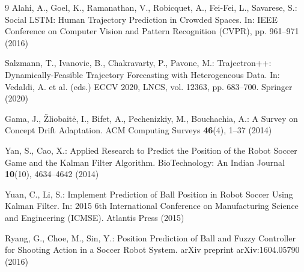 \documentclass[runningheads]{llncs}
\begin{document}
\begin{thebibliography}{9}
Alahi, A., Goel, K., Ramanathan, V., Robicquet, A., Fei-Fei, L., Savarese, S.: Social LSTM: Human Trajectory Prediction in Crowded Spaces. In: IEEE Conference on Computer Vision and Pattern Recognition (CVPR), pp. 961--971 (2016)

Salzmann, T., Ivanovic, B., Chakravarty, P., Pavone, M.: Trajectron++: Dynamically-Feasible Trajectory Forecasting with Heterogeneous Data. In: Vedaldi, A. et al. (eds.) ECCV 2020, LNCS, vol. 12363, pp. 683--700. Springer (2020)

Gama, J., \v{Z}liobait\.e, I., Bifet, A., Pechenizkiy, M., Bouchachia, A.: A Survey on Concept Drift Adaptation. ACM Computing Surveys \textbf{46}(4), 1--37 (2014)

Yan, S., Cao, X.: Applied Research to Predict the Position of the Robot Soccer Game and the Kalman Filter Algorithm. BioTechnology: An Indian Journal \textbf{10}(10), 4634--4642 (2014)

Yuan, C., Li, S.: Implement Prediction of Ball Position in Robot Soccer Using Kalman Filter. In: 2015 6th International Conference on Manufacturing Science and Engineering (ICMSE). Atlantis Press (2015)

Ryang, G., Choe, M., Sin, Y.: Position Prediction of Ball and Fuzzy Controller for Shooting Action in a Soccer Robot System. arXiv preprint arXiv:1604.05790 (2016)

\end{thebibliography}
\end{document}
